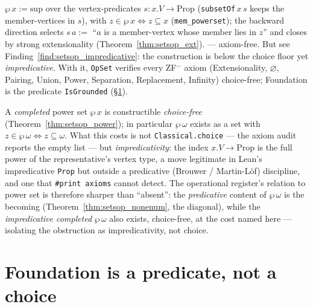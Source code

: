 \begin{theorem}
\label{thm:setsop_power}
\leanok
{}
$\wp\,x := \mathrm{sup}$ over the vertex-predicates $s : x.V \to \mathrm{Prop}$
(\texttt{subsetOf}\,$x\,s$ keeps the member-vertices in $s$), with
$z \in \wp\,x \iff z \subseteq x$ (\texttt{mem\_powerset}); the backward
direction selects $s\,a :=$ ``$a$ is a member-vertex whose member lies in $z$''
and closes by strong extensionality (Theorem~\ref{thm:setsop_ext}).
\axiomprofile{[]} --- axiom-free.  But see
Finding~\ref{find:setsop_impredicative}: the construction is below the choice
floor yet \emph{impredicative}.  With it, \texttt{OpSet} verifies every ZF$^-$
axiom (Extensionality, $\varnothing$, Pairing, Union, Power, Separation,
Replacement, Infinity) choice-free; Foundation is the predicate
\texttt{IsGrounded} (\S\ref{sec:setsop_grounded}).
\end{theorem}

\begin{finding}
\label{find:setsop_impredicative}
\leanok
{}
A \emph{completed} power set $\wp\,x$ is constructible \emph{choice-free}
(Theorem~\ref{thm:setsop_power}); in particular $\wp\,\omega$ exists as a set with
$z\in\wp\,\omega\iff z\subseteq\omega$.  What this costs is not
\texttt{Classical.choice} --- the axiom audit reports the empty list --- but \emph{impredicativity}: the index $x.V\to\mathrm{Prop}$ is the full
power of the representative's vertex type, a move legitimate in Lean's
impredicative \texttt{Prop} but outside a predicative (Brouwer / Martin-L\"of)
discipline, and one that \texttt{\#print axioms} cannot detect.  The operational
register's relation to power set is therefore sharper than ``absent'': the
\emph{predicative} content of $\wp\,\omega$ is the becoming
(Theorem~\ref{thm:setsop_nonenum}, the diagonal), while the \emph{impredicative
completed} $\wp\,\omega$ also exists, choice-free, at the cost named here ---
isolating the obstruction as impredicativity, not choice.
\end{finding}

\section{Foundation is a predicate, not a choice}
\label{sec:setsop_grounded}

